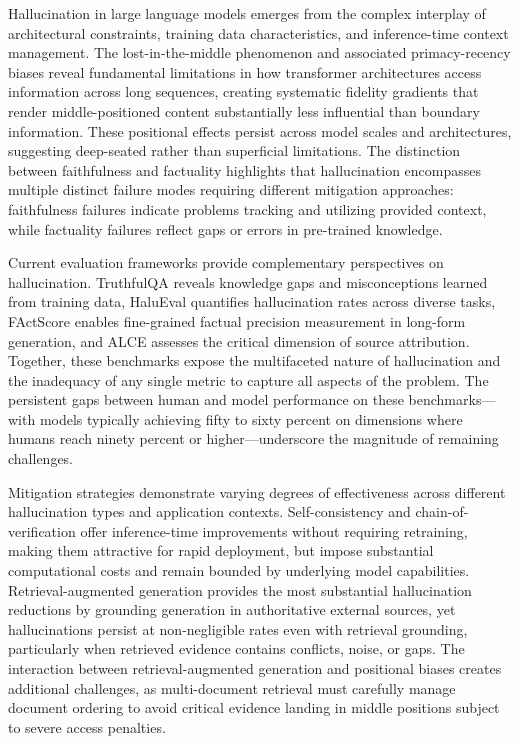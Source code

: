 \documentclass[11pt,letterpaper]{article}
\begin{document}
Hallucination in large language models emerges from the complex interplay of architectural constraints, training data characteristics, and inference-time context management. The lost-in-the-middle phenomenon and associated primacy-recency biases reveal fundamental limitations in how transformer architectures access information across long sequences, creating systematic fidelity gradients that render middle-positioned content substantially less influential than boundary information. These positional effects persist across model scales and architectures, suggesting deep-seated rather than superficial limitations. The distinction between faithfulness and factuality highlights that hallucination encompasses multiple distinct failure modes requiring different mitigation approaches: faithfulness failures indicate problems tracking and utilizing provided context, while factuality failures reflect gaps or errors in pre-trained knowledge.

Current evaluation frameworks provide complementary perspectives on hallucination. TruthfulQA reveals knowledge gaps and misconceptions learned from training data, HaluEval quantifies hallucination rates across diverse tasks, FActScore enables fine-grained factual precision measurement in long-form generation, and ALCE assesses the critical dimension of source attribution. Together, these benchmarks expose the multifaceted nature of hallucination and the inadequacy of any single metric to capture all aspects of the problem. The persistent gaps between human and model performance on these benchmarks---with models typically achieving fifty to sixty percent on dimensions where humans reach ninety percent or higher---underscore the magnitude of remaining challenges.

Mitigation strategies demonstrate varying degrees of effectiveness across different hallucination types and application contexts. Self-consistency and chain-of-verification offer inference-time improvements without requiring retraining, making them attractive for rapid deployment, but impose substantial computational costs and remain bounded by underlying model capabilities. Retrieval-augmented generation provides the most substantial hallucination reductions by grounding generation in authoritative external sources, yet hallucinations persist at non-negligible rates even with retrieval grounding, particularly when retrieved evidence contains conflicts, noise, or gaps. The interaction between retrieval-augmented generation and positional biases creates additional challenges, as multi-document retrieval must carefully manage document ordering to avoid critical evidence landing in middle positions subject to severe access penalties.
\end{document}
